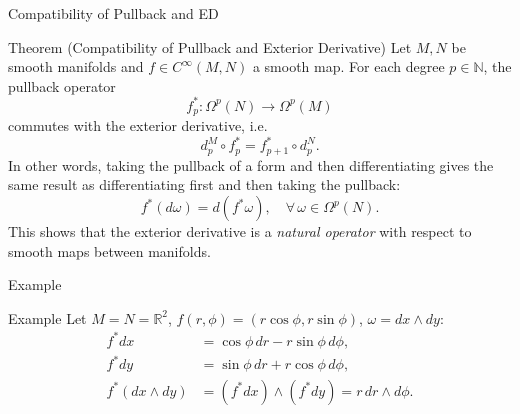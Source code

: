 \begin{frame}{Compatibility of Pullback and ED}
\vspace{-0.3cm}
\begin{block}{Theorem (Compatibility of Pullback and Exterior Derivative)}
Let \(M,N\) be smooth manifolds and \(f\in C^\infty(M,N)\) a smooth map. For each degree \(p\in\mathbb{N}\), the pullback operator
\vspace{-0.2cm}
\[
f_p^*:\Omega^p(N)\to\Omega^p(M)
\]
\vspace{-0.1cm}
commutes with the exterior derivative, i.e.
\vspace{-0.2cm}
\[
d_p^M\circ f_p^* = f_{p+1}^*\circ d_p^N.
\]
\vspace{-0.1cm}
In other words, taking the pullback of a form and then differentiating gives the same result as differentiating first and then taking the pullback:
\vspace{-0.2cm}
\[
f^*(d\omega)=d(f^*\omega), \quad \forall\,\omega\in\Omega^p(N).
\]
This shows that the exterior derivative is a \emph{natural operator} with respect to smooth maps between manifolds.
\end{block}

\end{frame}

\begin{frame}{Example}
\vspace{-0.2cm}
    \begin{center}
\end{center}
\vspace{-0.3cm}
\begin{block}{Example}
Let \(M=N=\mathbb{R}^2\), \(f(r,\phi)=(r\cos\phi,r\sin\phi)\), \(\omega=dx\wedge dy\):
\[
\begin{aligned}
f^*dx &= \cos\phi\,dr - r\sin\phi\,d\phi,\\
f^*dy &= \sin\phi\,dr + r\cos\phi\,d\phi,\\
f^*(dx\wedge dy)&=(f^*dx)\wedge(f^*dy)=r\,dr\wedge d\phi.
\end{aligned}
\]
\vspace{-0.1cm}
\end{block}
\end{frame}

